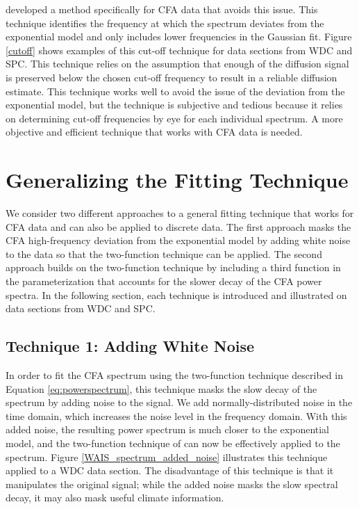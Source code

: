\documentclass[draft, jgrga]{AGUTeX}
\begin{document}
\begin{article}
\citet{Jones2017a} developed a method specifically for CFA data that avoids this issue. This technique identifies the frequency at which the spectrum deviates from the exponential model and only includes lower frequencies in the Gaussian fit. Figure \ref{cutoff} shows examples of this cut-off technique for data sections from WDC and SPC. This technique relies on the assumption that enough of the diffusion signal is preserved below the chosen cut-off frequency to result in a reliable diffusion estimate. This technique works well to avoid the issue of the deviation from the exponential model, but the technique is subjective and tedious because it relies on determining cut-off frequencies by eye for each individual spectrum. A more objective and efficient technique that works with CFA data is needed.

\section{Generalizing the Fitting Technique}
We consider two different approaches to a general fitting technique that works for CFA data and can also be applied to discrete data. The first approach masks the CFA high-frequency deviation from the exponential model by adding white noise to the data so that the two-function technique can be applied. The second approach builds on the two-function technique by including a third function in the parameterization that accounts for the slower decay of the CFA power spectra. In the following section, each technique is introduced and illustrated on data sections from WDC and SPC.

\subsection{Technique 1: Adding White Noise}
In order to fit the CFA spectrum using the two-function technique described in Equation \ref{eq:powerspectrum}, this technique masks the slow decay of the spectrum by adding noise to the signal. We add normally-distributed noise in the time domain, which increases the noise level in the frequency domain. With this added noise, the resulting power spectrum is much closer to the exponential model, and the two-function technique of \citet{Gkinis2014} can now be effectively applied to the spectrum. Figure \ref{WAIS_spectrum_added_noise} illustrates this technique applied to a WDC data section. The disadvantage of this technique is that it manipulates the original signal; while the added noise masks the slow spectral decay, it may also mask useful climate information.


\end{article}
\end{document}
